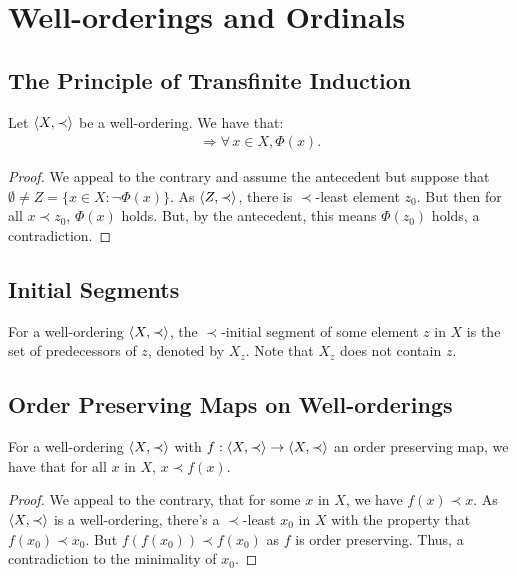 \section{Well-orderings and Ordinals}

\subsection{The Principle of Transfinite Induction}

Let $\langle X, \prec \rangle$ be a well-ordering. We have that: \begin{align*}
    [\forall \, x \in X, 
        (\forall \, y \prec x, \Phi(y)) \Rightarrow \Phi(x)
    ] \Rightarrow \forall \, x \in X, \Phi(x).
\end{align*}

\begin{proof}
    We appeal to the contrary and assume the antecedent
    but suppose that $\emptyset \neq Z = \{x \in X : \neg \Phi(x)\}$.
    As $\langle Z, \prec \rangle$, there is $\prec$-least element $z_0$.
    But then for all $x \prec z_0$, $\Phi(x)$ holds. But, by the
    antecedent, this means $\Phi(z_0)$ holds, a contradiction.
\end{proof}

\subsection{Initial Segments}

For a well-ordering $\langle X, \prec \rangle$, the $\prec$-initial
segment of some element $z$ in $X$ is the set of predecessors of $z$,
denoted by $X_z$. Note that $X_z$ does not contain $z$.

\subsection{Order Preserving Maps on Well-orderings}

For a well-ordering $\langle X, \prec \rangle$ with $f : \langle X, \prec \rangle 
\to \langle X, \prec \rangle$ an order preserving map, we have that
for all $x$ in $X$, $x \prec f(x)$.

\begin{proof}
    We appeal to the contrary, that for some $x$ in $X$, 
    we have $f(x) \prec x$.
    As $\langle X, \prec \rangle$ is a well-ordering, there's a
    $\prec$-least $x_0$ in $X$ with the property that 
    $f(x_0) \prec x_0$. But $f(f(x_0)) \prec f(x_0)$
    as $f$ is order preserving. Thus, a contradiction
    to the minimality of $x_0$.
\end{proof}

